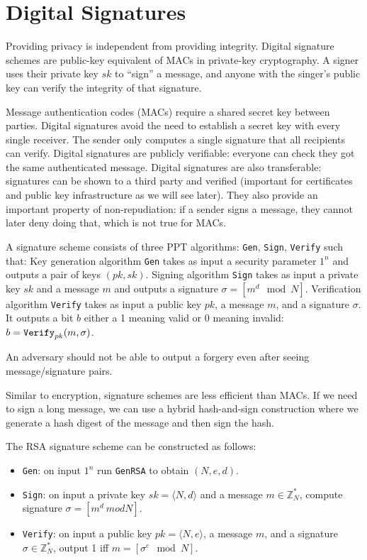 \section{Digital Signatures}

Providing privacy is independent from providing integrity. 
Digital signature schemes are public-key equivalent of MACs 
in private-key cryptography. A signer uses their private 
key $sk$ to “sign” a message, and anyone with the singer's 
public key can verify the integrity of that signature. 

Message authentication codes (MACs) require a shared secret key between parties.
Digital signatures avoid the need to establish a secret key with every single receiver.
The sender only computes a single signature that all recipients can verify.
Digital signatures are publicly verifiable: everyone can check they got the same
authenticated message.
Digital signatures are also transferable: signatures can be shown to a third party and
verified (important for certificates and public key infrastructure as we will see
later).
They also provide an important property of non-repudiation:
if a sender signs a message, they cannot later deny doing that, which is not true for MACs. 

A signature scheme consists of three PPT algorithms: 
\texttt{Gen}, \texttt{Sign}, \texttt{Verify} such that:
Key generation algorithm \texttt{Gen} takes as input a security 
parameter $1^n$ and outputs a pair of keys $(pk, sk)$.
Signing algorithm \texttt{Sign} takes as input a private key 
$sk$ and a message $m$ and
outputs a signature $\sigma = [m^d \mod N]$.
Verification algorithm \texttt{Verify} takes as input a 
public key $pk$, a message $m$, and a
signature $\sigma$. It outputs a bit $b$ either a 1 meaning valid or 0 meaning invalid:
$b = \text{\texttt{Verify}}_{pk}(m, \sigma)$.

An adversary should not be able to output a forgery 
even after seeing message/signature pairs. 

Similar to encryption, signature schemes are less efficient than MACs.
If we need to sign a long message, we can use a 
hybrid hash-and-sign construction where we generate a hash digest of 
the message and then sign the hash. 

The RSA signature scheme can be constructed as follows:
\begin{itemize}
    \item \texttt{Gen}: on input $1^n$ run \texttt{GenRSA} 
    to obtain $(N, e, d)$.
    \item \texttt{Sign}: on input a private key $sk = ⟨N, d⟩$ 
    and a message $m \in \mathbb{Z}_N^*$, compute signature 
    $\sigma = [m^d\ mod N]$.
    \item \texttt{Verify}: on input a public key $pk = ⟨N, e⟩$, 
    a message $m$, and a signature $\sigma \in \mathbb{Z}_N^*$, 
    output 1 iff $m = [\sigma^e \mod N]$.
\end{itemize}

